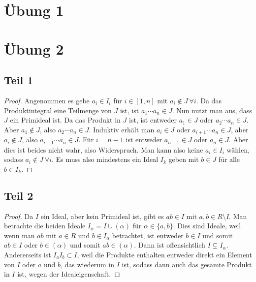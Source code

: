 \documentclass[10pt,a4paper]{article}
\begin{document}
\section{Übung 1}

\section{Übung 2}

\subsection{Teil 1}

\begin{proof}
  Angenommen es gebe $a_{i} \in I_{i}$ für $i \in [1, n]$ mit $a_{i} \not\in J\ \forall i$.
  Da das Produktintegral eine Teilmenge von $J$ ist, ist $a_{1} \cdots a_{n} \in J$.
  Nun nutzt man aus, dass $J$ ein Primideal ist.
  Da das Produkt in $J$ ist, ist entweder $a_{1} \in J$ oder $a_{2} \cdots a_{n} \in J$.
  Aber $a_{1} \not\in J$, also $a_{2} \cdots a_{n} \in J$.
  Induktiv erhält man $a_{i} \in J$ oder $a_{i + 1} \cdots a_{n} \in J$, aber $a_{i} \not\in J$, also $a_{i + 1} \cdots a_{n} \in J$.
  Für $i = n - 1$ ist entweder $a_{n - 1} \in J$ oder $a_{n} \in J$.
  Aber dies ist beides nicht wahr, also Widerspruch.
  Man kann also keine $a_{i} \in I_{i}$ wählen, sodass $a_{i} \not\in J\ \forall i$.
  Es muss also mindestens ein Ideal $I_{k}$ geben mit $b \in J$ für alle $b \in I_{k}$.
\end{proof}

\subsection{Teil 2}

\begin{proof}
  Da $I$ ein Ideal, aber kein Primideal ist, gibt es $ab \in I$ mit $a, b \in R \setminus I$.
  Man betrachte die beiden Ideale $I_{\alpha} = I \cup (\alpha)$ für $\alpha \in \{ a, b \}$.
  Dies sind Ideale, weil wenn man $ab$ mit $a \in R$ und $b \in I_{\alpha}$ betrachtet, ist entweder $b \in I$ und somit $ab \in I$ oder $b \in (\alpha)$ und somit $ab \in (\alpha)$.
  Dann ist offensichtlich $I \subsetneq I_{\alpha}$.
  Andererseits ist $I_{a}I_{b} \subset I$, weil die Produkte enthalten entweder direkt ein Element von $I$ oder $a$ und $b$, das wiederum in $I$ ist, sodass dann auch das gesamte Produkt in $I$ ist, wegen der Idealeigenschaft.
\end{proof}
\end{document}
